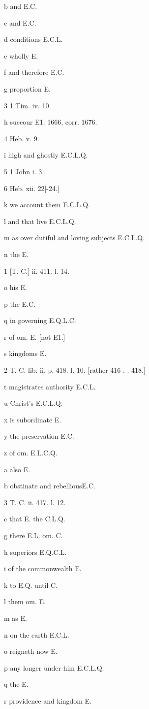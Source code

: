 b
and E.C.

c
and E.C.

d
conditions E.C.L.

e
wholly E.

f
and therefore E.C.

g
proportion E.

3
1 Tim. iv. 10.

h
succour E1. 1666, corr. 1676.

4
Heb. v. 9.

i
high and ghostly E.C.L.Q.

5
1 John i. 3.

6
Heb. xii. 22[-24.]

k
we account them E.C.L.Q.

l
and that live E.C.L.Q.

m
as over dutiful and loving subjects E.C.L.Q.

n
the E.

1
[T. C.] ii. 411. l. 14.

o
his E.

p
the E.C.

q
in governing E.Q.L.C.

r
of om. E. [not E1.]

s
kingdoms E.

2
T. C. lib. ii. p. 418. l. 10. [rather 416 . . 418.]

t
magistrates authority E.C.L.

u
Christ’s E.C.L.Q.

x
is subordinate E.

y
the preservation E.C.

z
of om. E.L.C.Q.

a
also E.

b
obstinate and rebelliousE.C.

3
T. C. ii. 417. l. 12.

c
that E. the C.L.Q.

g
there E.L. om. C.

h
superiors E.Q.C.L.

i
of the commonwealth E.

k
to E.Q. until C.

l
them om. E.

m
as E.

n
on the earth E.C.L.

o
reigneth now E.

p
any longer under him E.C.L.Q.

q
the E.

r
providence and kingdom E.


